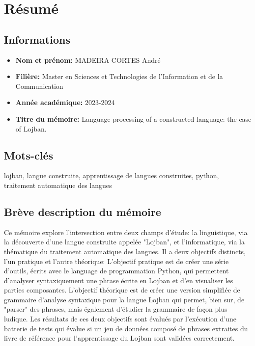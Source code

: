 \section*{Résumé} %
\label{sec:resume}

\subsection*{Informations}

\begin{itemize}
    \setlength\itemsep{0.1em}
    \item \textbf{Nom et prénom:} MADEIRA CORTES André
    \item \textbf{Filière:} Master en Sciences et Technologies de l'Information et de la Communication
    \item \textbf{Année académique:} 2023-2024
    \item \textbf{Titre du mémoire:} Language processing of a constructed language: the case of Lojban.
\end{itemize}

\subsection*{Mots-clés}

lojban, langue construite, apprentissage de langues construites, python, traitement automatique des langues

\subsection*{Brève description du mémoire}

Ce mémoire explore l'intersection entre deux champs d'étude: la linguistique, via la découverte d'une langue
construite appelée "Lojban", et l'informatique, via la thématique du traitement automatique des langues.
Il a deux objectifs distincts, l'un pratique et l'autre théorique:
L'objectif pratique est de créer une série d'outils, écrits avec le language de programmation Python,
qui permettent d'analyser syntaxiquement une phrase écrite en Lojban et d'en visualiser les parties composantes.
L'objectif théorique est de créer une version simplifiée de grammaire d'analyse syntaxique pour la langue Lojban qui permet,
bien sur, de "parser" des phrases, mais également d'étudier la grammaire de façon plus ludique.
Les résultats de ces deux objectifs sont évalués par l'exécution d'une batterie de tests qui évalue si un jeu de données
composé de phrases extraites du livre de référence pour l'apprentissage du Lojban sont validées correctement.